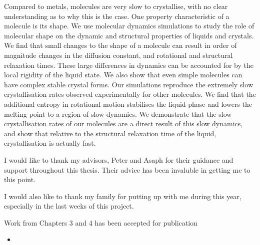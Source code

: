 
\beforepreface


Compared to metals, molecules are very slow to crystallise, with no clear understanding as to why this is the case. One property characteristic of a molecule is its shape. We use molecular dynamics simulations to study the role of molecular shape on the dynamic and structural properties of liquids and crystals. We find that small changes to the shape of a molecule can result in order of magnitude changes in the diffusion constant, and rotational and structural relaxation times. These large differences in dynamics can be accounted for by the local rigidity of the liquid state. We also show that even simple molecules can have complex stable crystal forms. Our simulations reproduce the extremely slow crystallisation rates observed experimentally for other molecules. We find that the additional entropy in rotational motion stabilises the liquid phase and lowers the melting point to a region of slow dynamics. We demonstrate that the slow crystallisation rates of our molecules are a direct result of this slow dynamics, and show that relative to the structural relaxation time of the liquid, crystallisation is actually fast.


\contributionsignature


I would like to thank my advisors, Peter and Asaph for their guidance and support throughout this thesis. Their advice has been invaluble in getting me to this point.

I would also like to thank my family for putting up with me during this year, especially in the last weeks of this project.


Work from Chapters 3 and 4 has been accepted for publication

\begin{itemize}
    \item {}
\end{itemize}

\afterpreface

